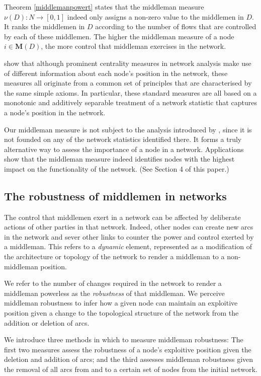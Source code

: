 \documentclass[11pt,fleqn]{article}
\begin{document}
\noindent
Theorem \ref{middlemanpowert} states that the middleman measure $\nu (D) \colon N \to [0,1]$ indeed only assigns a non-zero value to the middlemen in $D$. It ranks the middlemen in $D$ according to the number of flows that are controlled by each of these middlemen. The higher the middleman measure of a node $i \in \mathbf M (D)$, the more control that middleman exercises in the network.

\citet{BlochJackson2016} show that although prominent centrality measures in network analysis make use of different information about each node's position in the network, these measures all originate from a common set of principles that are characterised by the same simple axioms. In particular, these standard measures are all based on a monotonic and additively separable treatment of a network statistic that captures a node's position in the network.

Our middleman measure is not subject to the analysis introduced by \citet{BlochJackson2016}, since it is not founded on any of the network statistics identified there. It forms a truly alternative way to assess the importance of a node in a network. Applications show that the middleman measure indeed identifies nodes with the highest impact on the functionality of the network. (See Section 4 of this paper.)

\subsection{The robustness of middlemen in networks}

The control that middlemen exert in a network can be affected by deliberate actions of other parties in that network. Indeed, other nodes can create new arcs in the network and sever other links to counter the power and control exerted by a middleman. This refers to a \emph{dynamic} element, represented as a modification of the architecture or topology of the network to render a middleman to a non-middleman position.

We refer to the number of changes required in the network to render a middleman powerless as the \emph{robustness} of that middleman. We perceive middleman robustness to infer how a given node can maintain an exploitive position given a change to the topological structure of the network from the addition or deletion of arcs.

We introduce three methods in which to measure middleman robustness: The first two measures assess the robustness of a node's exploitive position given the deletion and addition of arcs; and the third assesses middleman robustness given the removal of all arcs from and to a certain set of nodes from the initial network.
\end{document}
